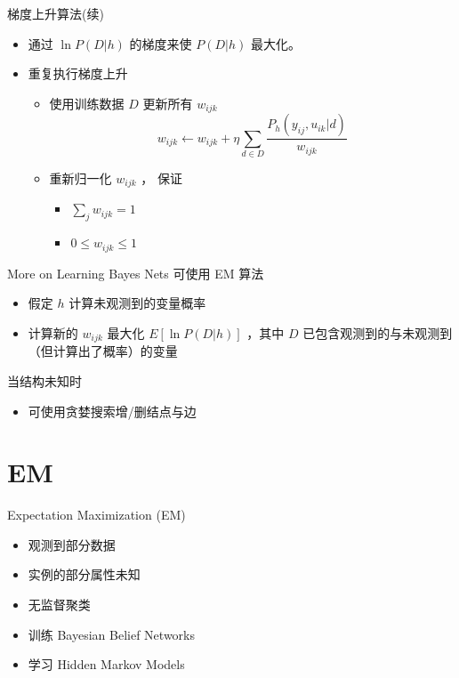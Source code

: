 \documentclass[presentation]{beamer}
\begin{document}
\begin{frame}[label={sec:orge319499}]{梯度上升算法(续)}
\begin{itemize}
\item 通过 \(\ln P(D|h)\) 的梯度来使 \(P(D|h)\) 最大化。
\item 重复执行梯度上升
\begin{itemize}
\item 使用训练数据 \(D\) 更新所有 \(w_{ijk}\) 
$$w_{ijk} \leftarrow w_{ijk} + \eta \sum_{d \in D} \frac{P_h(y_{ij}, u_{ik} |d)}{w_{ijk}}$$
\item 重新归一化 \(w_{ijk}\) ， 保证
\begin{itemize}
\item \(\sum_{j} w_{ijk} = 1\)
\item \(0 \leq w_{ijk} \leq 1\)
\end{itemize}
\end{itemize}
\end{itemize}
\end{frame}

\begin{frame}[label={sec:orgad1bc8b}]{More on Learning Bayes Nets}
可使用 EM 算法
\begin{itemize}
\item 假定 \(h\) 计算未观测到的变量概率
\item 计算新的 \(w_{ijk}\) 最大化 \(E[\ln P(D|h)]\) ，其中 \(D\) 已包含观测到的与未观测到（但计算出了概率）的变量
\end{itemize}

当结构未知时
\begin{itemize}
\item 可使用贪婪搜索增/删结点与边
\end{itemize}
\end{frame}

\section{EM}
\label{sec:org6d93179}

\begin{frame}[label={sec:orgb5ae440}]{Expectation Maximization (EM)}
\begin{itemize}
\item 观测到部分数据
\item 实例的部分属性未知
\item 无监督聚类
\item 训练 Bayesian Belief Networks
\item 学习 Hidden Markov Models
\end{itemize}
\end{frame}
\end{document}
